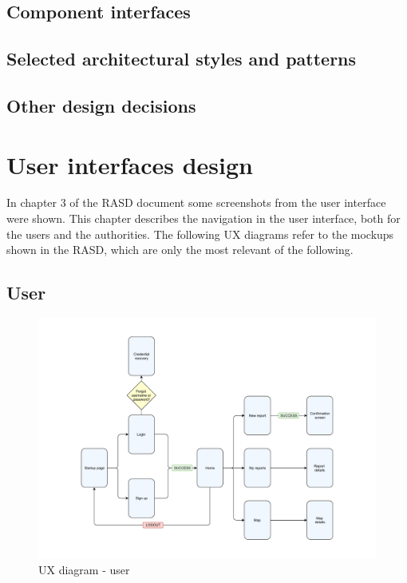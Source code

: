 \documentclass[12pt,a4paper]{report}
\begin{document}
		\section{Component interfaces}
		\section{Selected architectural styles and patterns}
		\section{Other design decisions}
	
	\chapter{User interfaces design}
	In chapter 3 of the RASD document some screenshots from the user interface were shown. This chapter describes the navigation in the user interface, both for the users and the authorities. The following UX diagrams refer to the mockups shown in the RASD, which are only the most relevant of the following.
	\section{User}
		\begin{figure}[H]
				\includegraphics[scale = 0.65, center]{userux}
				\caption{UX diagram - user}
		\end{figure}
\end{document}
